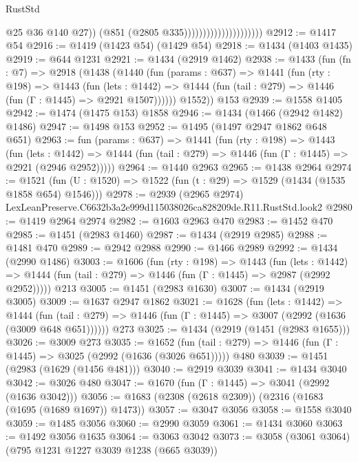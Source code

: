 \begin{lexlean}{RustStd}
\begin{coremodule}
                                              @25
                                              @36
                                              @140
                                              @27))
                                          (@851 (@2805 @335)))))))))))))))))))))
@2912 := @1417 @54
@2916 := @1419 (@1423 @54) (@1429 @54)
@2918 := @1434 (@1403 @1435)
@2919 := @644 @1231
@2921 := @1434 (@2919 @1462)
@2938 := @1433
    (fun (fn : @7) =>
    @2918
      (@1438
        (@1440
          (fun (params : @637) =>
          @1441
            (fun (rty : @198) =>
            @1443
              (fun (lets : @1442) =>
              @1444 (fun (tail : @279) => @1446 (fun (Γ : @1445) => @2921 @1507))))))
        @1552))
    @153
@2939 := @1558 @1405
@2942 := @1474 (@1475 @153) @1858
@2946 := @1434 (@1466 (@2942 @1482) @1486)
@2947 := @1498 @153
@2952 := @1495 (@1497 @2947 @1862 @648 @651)
@2963 := fun (params : @637) =>
  @1441
    (fun (rty : @198) =>
    @1443
      (fun (lets : @1442) =>
      @1444 (fun (tail : @279) => @1446 (fun (Γ : @1445) => @2921 (@2946 @2952)))))
@2964 := @1440 @2963
@2965 := @1438 @2964
@2974 := @1521 (fun (U : @1520) => @1522 (fun (t : @29) => @1529 (@1434 (@1535 @1858 @654) @1546)))
@2978 := @2939 (@2965 @2974) LexLeanPreserve.C6632b3a2e999d115038026ca828209de.R11.RustStd.look2
@2980 := @1419 @2964 @2974
@2982 := @1603 @2963 @470
@2983 := @1452 @470
@2985 := @1451 (@2983 @1460)
@2987 := @1434 (@2919 @2985)
@2988 := @1481 @470
@2989 := @2942 @2988
@2990 := @1466 @2989
@2992 := @1434 (@2990 @1486)
@3003 := @1606
    (fun (rty : @198) =>
    @1443
      (fun (lets : @1442) =>
      @1444 (fun (tail : @279) => @1446 (fun (Γ : @1445) => @2987 (@2992 @2952)))))
    @213
@3005 := @1451 (@2983 @1630)
@3007 := @1434 (@2919 @3005)
@3009 := @1637 @2947 @1862
@3021 := @1628
    (fun (lets : @1442) =>
    @1444 (fun (tail : @279) => @1446 (fun (Γ : @1445) => @3007 (@2992 (@1636 (@3009 @648 @651))))))
    @273
@3025 := @1434 (@2919 (@1451 (@2983 @1655)))
@3026 := @3009 @273
@3035 := @1652
    (fun (tail : @279) => @1446 (fun (Γ : @1445) => @3025 (@2992 (@1636 (@3026 @651)))))
    @480
@3039 := @1451 (@2983 (@1629 (@1456 @481)))
@3040 := @2919 @3039
@3041 := @1434 @3040
@3042 := @3026 @480
@3047 := @1670 (fun (Γ : @1445) => @3041 (@2992 (@1636 @3042)))
@3056 := @1683 (@2308 (@2618 @2309)) (@2316 (@1683 (@1695 (@1689 @1697)) @1473))
@3057 := @3047 @3056
@3058 := @1558 @3040
@3059 := @1485 @3056
@3060 := @2990 @3059
@3061 := @1434 @3060
@3063 := @1492 @3056 @1635
@3064 := @3063 @3042
@3073 := @3058 (@3061 @3064) (@795 @1231 @1227 @3039 @1238 (@665 @3039))

\end{coremodule}
\end{lexlean}
